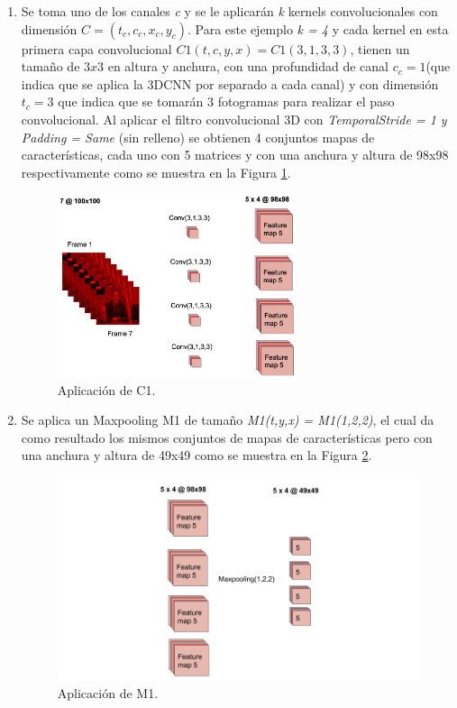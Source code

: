\begin{onehalfspacing}
\begin{enumerate}
    \item Se toma uno de los canales \textit{c} y se le aplicarán \textit {k} kernels convolucionales con dimensión $C = (t_{c},c_{c},x_{c},y_{c})$. Para este ejemplo \textit{k = 4} y cada kernel en esta primera capa convolucional $C1(t,c,y,x) = C1(3,1,3,3)$, tienen un tamaño de $3x3$ en altura y anchura, con una profundidad de canal $c_{c} = 1$(que indica que se aplica la 3DCNN por separado a cada canal) y con dimensión $t_{c}=3$ que indica que se tomarán 3 fotogramas para realizar el paso convolucional. Al aplicar el filtro convolucional 3D con \textit{TemporalStride = 1 y Padding = Same} (sin relleno) se obtienen 4 conjuntos mapas de características, cada uno con 5 matrices y con una anchura y altura de 98x98 respectivamente como se muestra en la Figura \ref{fig:Fig_Piloto_p2}. 
    \begin{figure}[h!]
	\centering
	\includegraphics[width=7cm,keepaspectratio]{XX_Figures/Fig_Piloto_p2.png}
	\caption{\footnotesize Aplicación de C1.}
	\label{fig:Fig_Piloto_p2}
    \end{figure}
    
    \item Se aplica un Maxpooling M1 de tamaño \textit{M1(t,y,x) = M1(1,2,2)}, el cual da como resultado los mismos conjuntos de mapas de características pero con una anchura y altura de 49x49 como se muestra en la Figura \ref{fig:Fig_Piloto_M1}.\\
    \begin{figure}[h!]
	\centering
	\includegraphics[width=12cm,keepaspectratio]{XX_Figures/Fig_Piloto_M1.png}
	\caption{Aplicación de M1.}
	\label{fig:Fig_Piloto_M1}
    \end{figure}
    

\end{enumerate}
\end{onehalfspacing}
